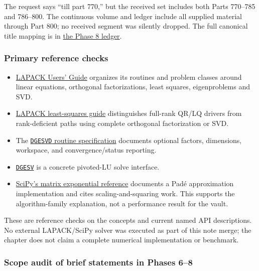 The request says ``till part 770,'' but the received set includes both Parts 770--785 and 786--800. The continuous volume and ledger include all supplied material through Part 800; no received segment was silently dropped. The full canonical title mapping is in \hyperref[appendix-fd090d982a15-phase-8---parts-701-800]{the Phase 8 ledger}.

\subsubsection{Primary reference checks}\label{appendix-a103e7846d21-primary-reference-checks}

\hypertarget{appendix-a103e7846d21-primary-reference-checks}{}

\begin{itemize}
\tightlist
\item
  \href{https://netlib.org/lapack/lug/index.html}{LAPACK Users' Guide} organizes its routines and problem classes around linear equations, orthogonal factorizations, least squares, eigenproblems and SVD.
\item
  \href{https://www.netlib.org/lapack/lug/node27.html}{LAPACK least-squares guide} distinguishes full-rank QR/LQ drivers from rank-deficient paths using complete orthogonal factorization or SVD.
\item
  The \href{https://netlib.org/lapack/explore-html/d1/d7f/group__gesvd_gac6bd5d4e645049e49bb70691180abf07.html}{\texttt{DGESVD} routine specification} documents optional factors, dimensions, workspace, and convergence/status reporting.
\item
  \href{https://netlib.org/lapack/explore-html/d8/da6/group__gesv_ga831ce6a40e7fd16295752d18aed2d541.html}{\texttt{DGESV}} is a concrete pivoted-LU solve interface.
\item
  \href{https://docs.scipy.org/doc/scipy/reference/generated/scipy.sparse.linalg.expm.html}{SciPy's matrix exponential reference} documents a Padé approximation implementation and cites scaling-and-squaring work. This supports the algorithm-family explanation, not a performance result for the vault.
\end{itemize}

These are reference checks on the concepts and current named API descriptions. No external LAPACK/SciPy solver was executed as part of this note merge; the chapter does not claim a complete numerical implementation or benchmark.

\subsubsection{Scope audit of brief statements in Phases 6--8}\label{appendix-a103e7846d21-scope-audit-of-brief-statements-in-phases-68}

